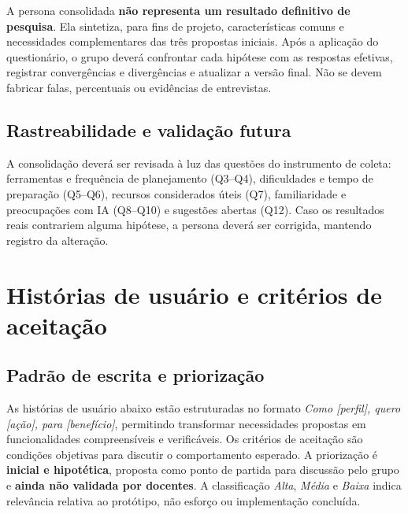 \documentclass[12pt,a4paper,oneside]{report}
\begin{document}
A persona consolidada \textbf{não representa um resultado definitivo de pesquisa}. Ela sintetiza, para fins de projeto, características comuns e necessidades complementares das três propostas iniciais. Após a aplicação do questionário, o grupo deverá confrontar cada hipótese com as respostas efetivas, registrar convergências e divergências e atualizar a versão final. Não se devem fabricar falas, percentuais ou evidências de entrevistas.

\subsection{Rastreabilidade e validação futura}
A consolidação deverá ser revisada à luz das questões do instrumento de coleta: ferramentas e frequência de planejamento (Q3--Q4), dificuldades e tempo de preparação (Q5--Q6), recursos considerados úteis (Q7), familiaridade e preocupações com IA (Q8--Q10) e sugestões abertas (Q12). Caso os resultados reais contrariem alguma hipótese, a persona deverá ser corrigida, mantendo registro da alteração.

\section{Histórias de usuário e critérios de aceitação}
\label{sec:userstories}

\subsection{Padrão de escrita e priorização}
As histórias de usuário abaixo estão estruturadas no formato \emph{Como [perfil], quero [ação], para [benefício]}, permitindo transformar necessidades propostas em funcionalidades compreensíveis e verificáveis. Os critérios de aceitação são condições objetivas para discutir o comportamento esperado. A priorização é \textbf{inicial e hipotética}, proposta como ponto de partida para discussão pelo grupo e \textbf{ainda não validada por docentes}. A classificação \emph{Alta}, \emph{Média} e \emph{Baixa} indica relevância relativa ao protótipo, não esforço ou implementação concluída.
\end{document}

